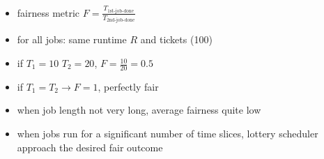 \documentclass[8pt,a4paper,landscape]{extarticle}
\begin{document}
\begin{multicols*}{3}
\begin{minipage}{.45\linewidth}
\end{minipage}
\begin{minipage}{.55\linewidth}
  \flushleft
  \begin{itemize}
  \item fairness metric $F = \frac{T_{\text{1st-job-done}}}{T_{\text{2nd-job-done}}}$
  \item for all jobs: same runtime $R$ and tickets (100)
  \item if $T_1 = 10$ $T_2 = 20$, $F = \frac{10}{20} = 0.5$
  \item if $T_1 = T_2 \to F = 1$, perfectly fair
  \item when job length not very long, average fairness quite low
  \item when jobs run for a significant number of time slices, lottery scheduler approach the desired fair outcome
  \end{itemize}
\end{minipage}

\end{multicols*}
\end{document}
